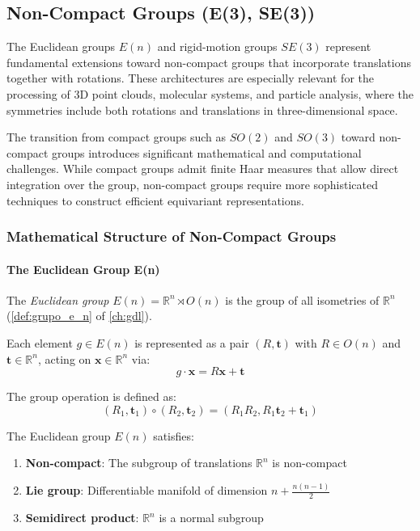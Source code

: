 \subsection{Non-Compact Groups (E(3), SE(3))}\label{subsec:grupos_no_compactos}

The Euclidean groups $E(n)$ and rigid-motion groups $SE(3)$ represent fundamental extensions toward non-compact groups that incorporate translations together with rotations. These architectures are especially relevant for the processing of 3D point clouds, molecular systems, and particle analysis, where the symmetries include both rotations and translations in three-dimensional space.

The transition from compact groups such as $SO(2)$ and $SO(3)$ toward non-compact groups introduces significant mathematical and computational challenges. While compact groups admit finite Haar measures that allow direct integration over the group, non-compact groups require more sophisticated techniques to construct efficient equivariant representations.

\subsubsection{Mathematical Structure of Non-Compact Groups}

\paragraph{The Euclidean Group E(n)}

The \textit{Euclidean group} $E(n) = \mathbb{R}^n \rtimes O(n)$ is the group of all isometries of $\mathbb{R}^n$ (\autoref{def:grupo_e_n} of \autoref{ch:gdl}).\label{def:grupo_euclidiano}

Each element $g \in E(n)$ is represented as a pair $(R, \mathbf{t})$ with $R \in O(n)$ and $\mathbf{t} \in \mathbb{R}^n$, acting on $\mathbf{x} \in \mathbb{R}^n$ via:
\begin{equation}
g \cdot \mathbf{x} = R\mathbf{x} + \mathbf{t}
\end{equation}

The group operation is defined as:
\begin{equation}
(R_1, \mathbf{t}_1) \circ (R_2, \mathbf{t}_2) = (R_1 R_2, R_1 \mathbf{t}_2 + \mathbf{t}_1)
\end{equation}

\begin{proposition}[Properties of $E(n)$]
The Euclidean group $E(n)$ satisfies:
\begin{enumerate}
    \item \textbf{Non-compact}: The subgroup of translations $\mathbb{R}^n$ is non-compact
    \item \textbf{Lie group}: Differentiable manifold of dimension $n + \frac{n(n-1)}{2}$
    \item \textbf{Semidirect product}: $\mathbb{R}^n$ is a normal subgroup
\end{enumerate}
\end{proposition}

